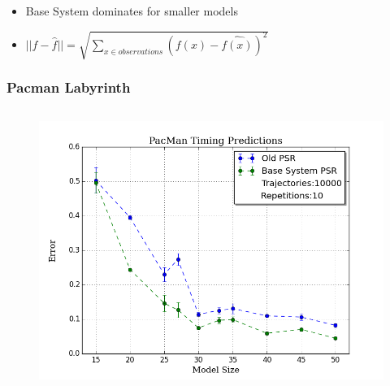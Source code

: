 \documentclass{beamer}
\begin{document}
\begin{frame}
\begin{columns}[c]
\end{columns}

\begin{itemize}
\item[] Base System dominates for smaller models

\item[] $||f - \hat{f}|| = \sqrt{\sum\nolimits_{x \in observations}(f(x) - \hat{f(x)})^2}$ 
\end{itemize}

\end{frame}



\begin{frame}
\frametitle{Pacman Labyrinth}




\begin{columns}[c]

\begin{figure}
\includegraphics[width=1.0\linewidth]{uCOREPICS/PacManTiming.png}
\end{figure}


\end{columns}
\end{frame}
\end{document}
